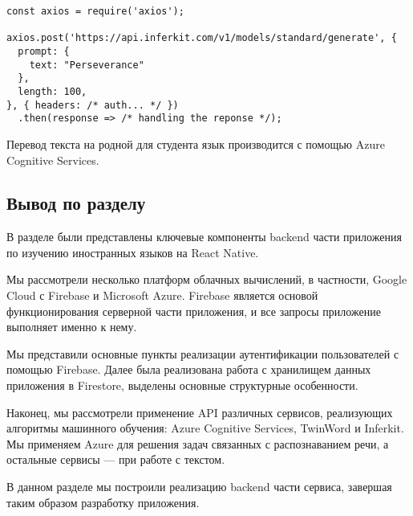 \begin{lstlisting}[basicstyle=\fontsize{11}{11}\selectfont,tabsize=4,breaklines=true,caption={Пример генерации текста с помощью Inferkit.},captionpos=b,label={lst:inferkit-generator}]
const axios = require('axios');

axios.post('https://api.inferkit.com/v1/models/standard/generate', {
  prompt: {
    text: "Perseverance"
  },
  length: 100,
}, { headers: /* auth... */ })
  .then(response => /* handling the reponse */);
\end{lstlisting}

Перевод текста на родной для студента язык производится с помощью Azure Cognitive Services.

\subsection{Вывод по разделу}
В разделе были представлены ключевые компоненты backend части приложения по изучению иностранных языков на React Native. 

Мы рассмотрели несколько платформ облачных вычислений, в частности, Google Cloud с Firebase и Microsoft Azure. Firebase является основой функционирования серверной части приложения, и все запросы приложение выполняет именно к нему.

Мы представили основные пункты реализации аутентификации пользователей с помощью Firebase. Далее была реализована работа с хранилищем данных приложения в Firestore, выделены основные структурные особенности.

Наконец, мы рассмотрели применение API различных сервисов, реализующих алгоритмы машинного обучения: Azure Cognitive Services, TwinWord и Inferkit. Мы применяем Azure для решения задач связанных с распознаванием речи, а остальные сервисы --- при работе с текстом.

В данном разделе мы построили реализацию backend части сервиса, завершая таким образом разработку приложения.
